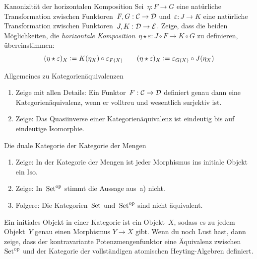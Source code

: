 \documentclass{uebblatt}
\begin{document}
\begin{aufgabe}{Kanonizität der horizontalen Komposition}
Sei~$\eta : F \to G$ eine natürliche Transformation zwischen
Funktoren~$F,G : \mathcal{C} \to \mathcal{D}$ und~$\varepsilon : J \to K$ eine natürliche
Transformation zwischen Funktoren~$J,K : \mathcal{D} \to \mathcal{E}$. Zeige, dass die beiden
Möglichkeiten, die \emph{horizontale Komposition}~$\eta \star \varepsilon : J
\circ F \to K \circ G$ zu definieren, übereinstimmen:
\[ (\eta \star \varepsilon)_X \vcentcolon= K(\eta_X) \circ \varepsilon_{F(X)}
  \qquad
  (\eta \star \varepsilon)_X \vcentcolon= \varepsilon_{G(X)} \circ J(\eta_X)
\]
\end{aufgabe}
\vspace{-2em}

\begin{aufgabe}{Allgemeines zu Kategorienäquivalenzen}
\begin{enumerate}
\item Zeige mit allen Details: Ein Funktor~$F : \mathcal{C} \to \mathcal{D}$ definiert genau dann
eine Kategorienäquivalenz, wenn er volltreu und wesentlich surjektiv ist.
\item Zeige: Das Quasiinverse einer Kategorienäquivalenz ist eindeutig bis auf
eindeutige Isomorphie.
\end{enumerate}
\end{aufgabe}

\begin{aufgabe}{Die duale Kategorie der Kategorie der Mengen}
\begin{enumerate}
\item Zeige: In der Kategorie der Mengen ist jeder Morphismus ins initiale
Objekt ein Iso.
\item Zeige: In~$\mathrm{Set}^{\mathrm{op}}$ stimmt die Aussage aus~a) nicht.
\item Folgere: Die Kategorien~$\mathrm{Set}$ und~$\mathrm{Set}^{\mathrm{op}}$ sind nicht äquivalent.
\end{enumerate}
\begin{minipage}{0.87\textwidth}
\tiny Ein initiales Objekt in einer Kategorie ist ein Objekt~$X$, sodass es zu
jedem Objekt~$Y$ genau einen Morphismus $Y \to X$ gibt.
Wenn du noch Lust hast, dann zeige, dass der kontravariante
Potenzmengenfunktor eine Äquivalenz zwischen~$\mathrm{Set}^{\mathrm{op}}$ und der Kategorie der
vollständigen atomischen Heyting-Algebren definiert.\par
\end{minipage}
\end{aufgabe}
\end{document}
